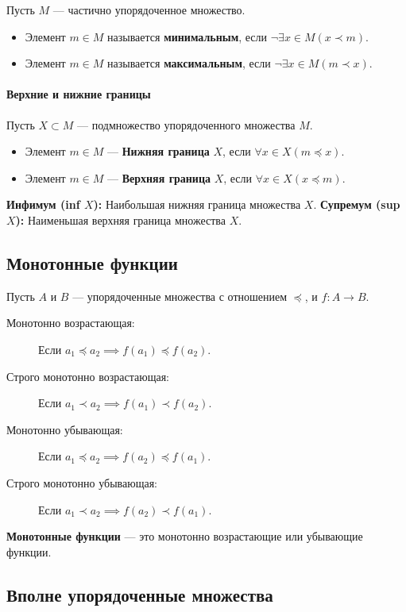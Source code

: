 Пусть $M$ --- частично упорядоченное множество.
\begin{itemize}
    \item Элемент $m \in M$ называется \textbf{минимальным}, если $\neg \exists x \in M (x \prec m)$.
    \item Элемент $m \in M$ называется \textbf{максимальным}, если $\neg \exists x \in M (m \prec x)$.
\end{itemize}

\paragraph{Верхние и нижние границы}
Пусть $X \subset M$ --- подмножество упорядоченного множества $M$.
\begin{itemize}
    \item Элемент $m \in M$ --- \textbf{Нижняя граница} $X$, если $\forall x \in X (m \preceq x)$.
    \item Элемент $m \in M$ --- \textbf{Верхняя граница} $X$, если $\forall x \in X (x \preceq m)$.
\end{itemize}
\textbf{Инфимум (inf $X$):} Наибольшая нижняя граница множества $X$.
\textbf{Супремум (sup $X$):} Наименьшая верхняя граница множества $X$.

\subsection*{Монотонные функции}

Пусть $A$ и $B$ --- упорядоченные множества с отношением $\preceq$, и $f: A \to B$.

\begin{description}
    \item[Монотонно возрастающая:] Если $a_1 \preceq a_2 \implies f(a_1) \preceq f(a_2)$.
    \item[Строго монотонно возрастающая:] Если $a_1 \prec a_2 \implies f(a_1) \prec f(a_2)$.
    \item[Монотонно убывающая:] Если $a_1 \preceq a_2 \implies f(a_2) \preceq f(a_1)$.
    \item[Строго монотонно убывающая:] Если $a_1 \prec a_2 \implies f(a_2) \prec f(a_1)$.
\end{description}
\textbf{Монотонные функции} --- это монотонно возрастающие или убывающие функции.

\subsection*{Вполне упорядоченные множества}

